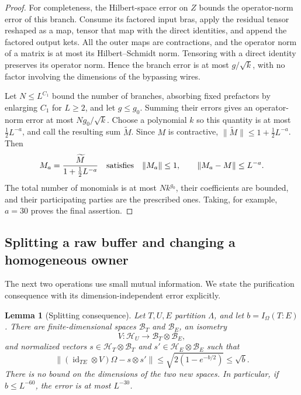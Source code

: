 \documentclass[11pt]{article}
\numberwithin{equation}{section}
\newtheorem{lemma}[theorem]{Lemma}
\theoremstyle{definition}
\theoremstyle{remark}
\begin{document}
\begin{proof}
For completeness, the Hilbert-space error on $Z$ bounds the operator-norm
error of this branch.  Consume its factored input bras, apply the residual
tensor reshaped as a map, tensor that map with the direct identities, and
append the factored output kets.  All the outer maps are contractions,
and the operator norm of a matrix is at most its Hilbert--Schmidt norm.
Tensoring with a direct identity preserves its operator norm.  Hence the
branch error is at most $g/\sqrt{k}$, with no factor involving the dimensions
of the bypassing wires.

Let $N\le L^{C_1}$ bound the number of branches, absorbing fixed prefactors
by enlarging $C_1$ for $L\ge2$, and let $g\le g_0$.  Summing their errors
gives an operator-norm error at most $Ng_0/\sqrt{k}$.  Choose a polynomial
$k$ so this quantity is at most $\tfrac12L^{-a}$, and call the resulting
sum $\widetilde M$.  Since $M$ is contractive,
$\lVert \widetilde M\rVert\le1+\tfrac12L^{-a}$.  Then
\[
 M_a=\frac{\widetilde M}{1+\tfrac12L^{-a}}
 \quad\hbox{satisfies}\quad
 \lVert M_a\rVert\le1,\qquad \lVert M_a-M\rVert\le L^{-a}.
\]
The total number of monomials is at most $Nk^{g_0}$, their coefficients are
bounded, and their participating parties are the prescribed ones.  Taking,
for example, $a=30$ proves the final assertion.
\end{proof}

\subsection{Splitting a raw buffer and changing a homogeneous owner}

The next two operations use small mutual information.  We state the
purification consequence with its dimension-independent error explicitly.

\begin{lemma}[Splitting consequence]\label{lem:splitting}
Let $T,U,E$ partition $\Lambda$, and let
$b=I_\Omega(T:E)$.  There are finite-dimensional spaces $\mathcal B_T$ and
$\mathcal B_E$, an isometry
\[
 V:\mathcal H_U\longrightarrow\mathcal B_T\otimes\mathcal B_E,
\]
and normalized vectors
$s\in\mathcal H_T\otimes\mathcal B_T$ and
$s'\in\mathcal H_E\otimes\mathcal B_E$ such that
\begin{equation}\label{eq:frame-splitting}
 \lVert (\operatorname{id}_{TE}\otimes V)\Omega-s\otimes s'\rVert
       \le\sqrt{2(1-e^{-b/2})}\le\sqrt b.
\end{equation}
There is no bound on the dimensions of the two new spaces.  In particular,
if $b\le L^{-60}$, the error is at most $L^{-30}$.
\end{lemma}
\end{document}

